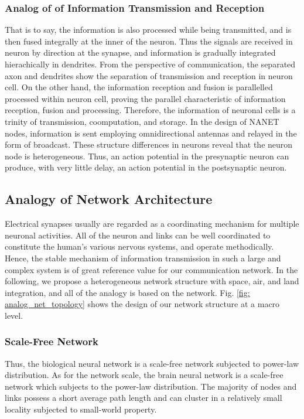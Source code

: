 \documentclass[journal,comsoc]{IEEEtran}
\begin{document}
			\subsubsection{Analog of of Information Transmission and Reception}
				That is to say, the information is also processed while being transmitted,  and is then fused integrally at the inner of the neuron.
				Thus the signals are received in neuron by direction at the synapse, and information is gradually integrated hierachically in dendrites.	
				From the perspective of communication, the separated axon and dendrites show the separation of transmission and reception in neuron cell. 
				On the other hand, the information reception and fusion is parallelled processed within neuron cell, proving the parallel characteristic of information reception, fusion and processing.
				Therefore, the information of neuronal cells is a trinity of transmission, coomputation, and storage.
				In the design of NANET nodes, information is sent employing omnidirectional antennas and relayed in the form of broadcast. 
				These structure differences in neurons reveal that the neuron node is heterogeneous.
					Thus, an action potential in the presynaptic neuron can produce, with very little delay, an action potential in the postsynaptic neuron. 
					
		\subsection{Analogy of Network Architecture}
		Electrical synapses usually are regarded as a coordinating mechanism for multiple neuronal activities.
			All of the neuron and links can be well coordinated to constitute the human's various nervous systems, and operate methodically.
			Hence, the stable mechanism of information transmission in such a large and complex system is of great reference value for our communication network.
			In the following, we propose a heterogeneous network structure with space, air, and land integration, and all of the analogy is based on the network.
			Fig. \ref{fig: analog_net_topology} shows the design of our network structure at a macro level.
			\subsubsection{Scale-Free Network}
			Thus, the biological neural network is a scale-free network subjected to power-law distribution.
				As for the network scale, the brain neural network is a scale-free network which subjects to the power-law distribution. 
				The majority of nodes and links possess a short average path length and can cluster in a relatively small locality subjected to small-world property.
				
\end{document}
